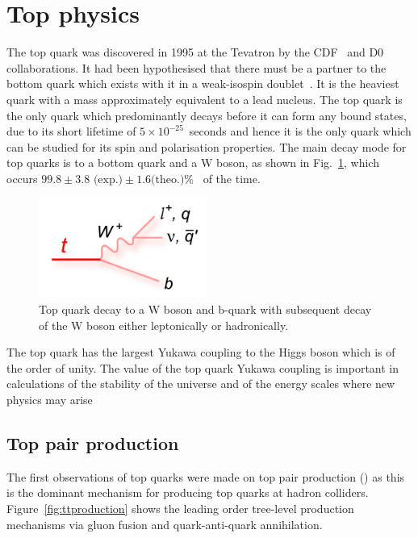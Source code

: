 \section{Top physics}
The top quark was discovered in 1995 at the Tevatron by the CDF~\cite{PhysRevLett.74.2626} and D0~\cite{Abachi:1995iq} collaborations. It had been hypothesised that there must be a partner to the bottom quark which exists with it in a weak-isospin doublet~\cite{Kobayashi:1973fv}. It is the heaviest quark with a mass approximately equivalent to a lead nucleus. The top quark is the only quark which predominantly decays before it can form any bound states, due to its short lifetime of $5\times10^{-25}$~seconds and hence it is the only quark which can be studied for its spin and polarisation properties. The main decay mode for top quarks is to a bottom quark and a W boson, as shown in Fig.~\ref{fig:tdecay}, which occurs $99.8\pm3.8\textrm{ (exp.)}\pm1.6\textrm {(theo.)} \%$~\cite{2014arXiv1403.7366C} of the time.
\begin{figure}[ht!]
\begin{center}
    \includegraphics[width=0.49\textwidth]{images/Theory/topdecay.png}
    \caption{Top quark decay to a W boson and b-quark with subsequent decay of the W boson either leptonically or hadronically.}
    \label{fig:tdecay}
\end{center}
\end{figure}

The top quark has the largest Yukawa coupling to the Higgs boson which is of the order of unity. The value of the top quark Yukawa coupling is important in calculations of the stability of the universe and of the energy scales where new physics may arise~\cite{Bezrukov:2014ina}

\subsection{Top pair production}

The first observations of top quarks were made on top pair production (\ttbar) as this is the dominant mechanism for producing top quarks at hadron colliders. Figure~\ref{fig:ttproduction} shows the leading order tree-level production mechanisms via gluon fusion and quark-anti-quark annihilation. 

